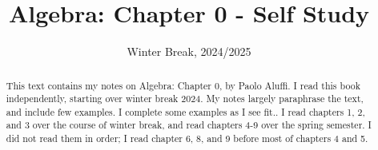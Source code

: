 \documentclass[11pt, letterpaper]{report}
\title{Algebra: Chapter 0 - Self Study}
\date{Winter Break, 2024/2025}
\begin{document}
\maketitle
\begin{abstract}
	This text contains my notes on Algebra: Chapter 0, by Paolo Aluffi. I read this book independently, starting over winter break 2024. My notes largely paraphrase the text, and include few examples. I complete some examples as I see fit.. I read chapters 1, 2, and 3 over the course of winter break, and read chapters 4-9 over the spring semester. I did not read them in order; I read chapter 6, 8, and 9 before most of chapters 4 and 5.
\end{abstract}
\tableofcontents
%
%
%
%
%
%
%
%

\end{document}
